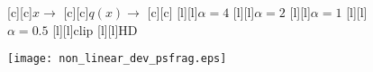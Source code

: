 \documentclass{article}
\begin{document}
\begin{figure}[htb]
  \begin{center}

        [c][c]{$x\rightarrow$}
        [c][c]{$q(x)\rightarrow$}
        [c][c]{}
        [l][l]{$\alpha=4$}
        [l][l]{$\alpha=2$}
        [l][l]{$\alpha=1$}
        [l][l]{$\alpha=0.5$}
        [l][l]{clip}
        [l][l]{HD}


    \texttt{[image: non\_linear\_dev\_psfrag.eps]}
    \end{center}
\end{figure}
\end{document}
